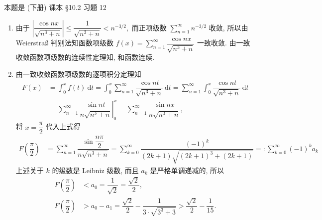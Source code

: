\begin{solution}

本题是 (下册) 课本 §10.2 习题 12

\begin{enumerate}
\item 由于 $\displaystyle \left\lvert \dfrac{\cos nx}{\sqrt{n^3 + n}} \right\rvert \leqslant \dfrac{1}{\sqrt{n^3 + n}} < n^{-3/2},$ 而正项级数 $\displaystyle \sum\limits_{n=1}^{\infty} n^{-3/2}$ 收敛, 所以由 Weierstraß 判别法知函数项级数 $\displaystyle f(x) = \sum\limits_{n=1}^{\infty} \dfrac{\cos nx}{\sqrt{n^3 + n}}$ 一致收敛. 由一致收敛函数项级数的连续性定理知, 和函数连续.
\item 由一致收敛函数项级数的逐项积分定理知
\begin{align*}
F(x) & = \int_0^x f(t) ~ \mathrm{d} t = \int_0^x \sum\limits_{n=1}^{\infty} \dfrac{\cos nt}{\sqrt{n^3 + n}} ~ \mathrm{d} t = \sum\limits_{n=1}^{\infty} \int_0^x \dfrac{\cos nt}{\sqrt{n^3 + n}} ~ \mathrm{d} t \\
& = \sum\limits_{n=1}^{\infty} \left. \dfrac{\sin nt}{n\sqrt{n^3 + n}} \right|_0^x = \sum\limits_{n=1}^{\infty} \dfrac{\sin nx}{n\sqrt{n^3 + n}},
\end{align*}
将 $x = \dfrac{\pi}{2}$ 代入上式得
\begin{align*}
F \left( \dfrac{\pi}{2} \right) & = \sum\limits_{n=1}^{\infty} \dfrac{\sin \dfrac{n\pi}{2}}{n\sqrt{n^3 + n}} = \sum\limits_{k=0}^{\infty} \dfrac{(-1)^k}{(2k+1)\sqrt{(2k+1)^3 + (2k+1)}} = : \sum\limits_{k=0}^{\infty} (-1)^k a_k
\end{align*}
上述关于 $k$ 的级数是 Leibniz 级数, 而且 $a_k$ 是严格单调递减的, 所以
\begin{align*}
F \left( \dfrac{\pi}{2} \right) & < a_0 = \dfrac{1}{\sqrt{2}} = \dfrac{\sqrt{2}}{2}, \\
F \left( \dfrac{\pi}{2} \right) & > a_0 - a_1 = \dfrac{\sqrt{2}}{2} - \dfrac{1}{3 \cdot \sqrt{3^3 + 3}} > \dfrac{\sqrt{2}}{2} - \dfrac{1}{15}.
\end{align*}
\end{enumerate}

\end{solution}


